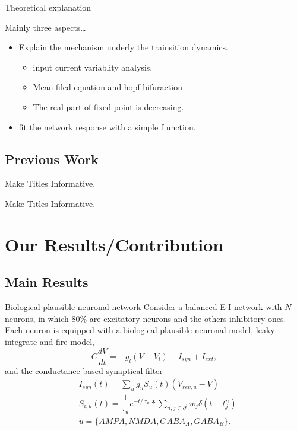 \documentclass{beamer}
\begin{document}
\begin{frame}{Theoretical explanation}

  Mainly three aspects\ldots
  \begin{itemize}
  \item Explain the mechanism underly the trainsition dynamics.
    \begin{itemize}
    \item 
    input current variablity analysis.
    \item
      Mean-filed equation and hopf bifuraction
    \item    
      The real part of fixed point is decreasing.
    \end{itemize}
  \item
   fit the network response with a simple f unction.
  \end{itemize}
\end{frame}


\subsection{Previous Work}

\begin{frame}{Make Titles Informative.}
\end{frame}

\begin{frame}{Make Titles Informative.}
\end{frame}



\section{Our Results/Contribution}

\subsection{Main Results}
\begin{frame}{Biological plausible neuronal network}
	Consider a balanced E-I network with $ N $ neurons, in which $ 80\% $  are excitatory neurons and the others inhibitory ones. Each neuron is equipped with a biological plausible neuronal model, leaky integrate and fire model, 
	\begin{equation*}
		C \dfrac{dV}{dt} = -g_{l}(V - V_{l}) + I_{syn} + I_{ext},
	\end{equation*}
	and the conductance-based synaptical filter
	\begin{equation*}
		\begin{aligned}
			&I_{syn}(t) = \sum_{u} g_{u} S_{u}(t)(V_{rev, u} - V)\\
			&S_{i, u}(t) = \dfrac{1}{\tau_{u}}e^{-t /\ \tau_{u}} \ast \sum_{n, j \in \partial ^{i}} w_{j} \delta \left(t - t_{j}^{n}\right)\\
			&u=\{AMPA, NMDA, GABA_{A}, GABA_{B}\}.
		\end{aligned}
	\end{equation*}
\end{frame}
\end{document}
